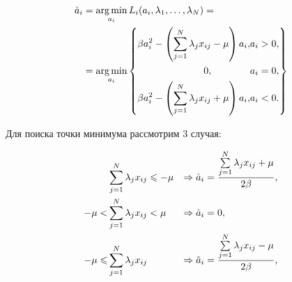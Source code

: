 \begin{equation}
	\label{hatAi}
	\begin{split}
		\hat a_i &= \mathop{\mbox{arg\ \!min}}\limits_{a_i} L_i(a_i,\lambda_{1},\ldots,\lambda_{N}) = \\
				 &=	\mathop{\mbox{arg\ \!min}}\limits_{a_i} \left\{
				 	\begin{aligned}
						\beta a_i^2 - \left(\sum\limits_{j=1}^N\lambda_jx_{ij}-\mu\right)a_i, &a_i > 0,\\
						0, \qquad\qquad &a_i = 0,\\
						\beta a_i^2 - \left(\sum\limits_{j=1}^N\lambda_jx_{ij}+\mu\right)a_i, &a_i < 0.\\
					\end{aligned}	
					\right\}
	\end{split}
\end{equation}

Для поиска точки минимума рассмотрим 3 случая:

\begin{align}
	\label{hatAi}
	         &\sum\limits_{j=1}^N\lambda_jx_{ij} \leqslant -\mu &\Rightarrow \hat a_i &= \frac{\sum\limits_{j=1}^N\lambda_jx_{ij}+\mu}{2\beta}, \\
	-\mu <   &\sum\limits_{j=1}^N\lambda_jx_{ij} < \mu 	&\Rightarrow \hat a_i &= 0, \\
	-\mu \leqslant &\sum\limits_{j=1}^N\lambda_jx_{ij} 			&\Rightarrow \hat a_i &= \frac{\sum\limits_{j=1}^N\lambda_jx_{ij}-\mu}{2\beta},
\end{align}
